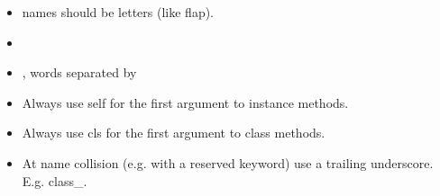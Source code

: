 \documentclass[letterpaper,10pt,english]{sphinxmanual}
\begin{document}
\begin{enumerate}
\begin{itemize}
\item {} 
 names should be  letters (like flap).

\item {} 

\item {} 
, words separated by 

\item {} 
Always use self for the first argument to instance methods.

\item {} 
Always use cls for the first argument to class methods.

\item {} 
At name collision (e.g. with a reserved keyword) use a trailing underscore. E.g. class\_.

\end{itemize}

\end{enumerate}
\end{document}
